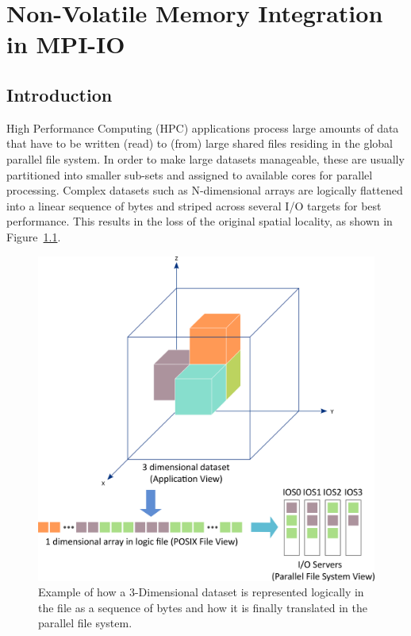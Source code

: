 \chapter{Non-Volatile Memory Integration in MPI-IO} \label{chap: deeper}

\section{Introduction}
\label{sec: motivation}
High Performance Computing (HPC) applications process large amounts of data that have to be written (read) to (from) large shared files residing in the global parallel file system. In order to make large datasets manageable, these are 
usually partitioned into smaller sub-sets and assigned to available cores for parallel processing. Complex datasets such as N-dimensional arrays are logically flattened into a linear sequence of bytes and striped across several I/O targets 
for best performance. This results in the loss of the original spatial locality, as shown in Figure~\ref{fig: small-io}.

\begin{figure}[!htb]
\centering
\includegraphics[width=\textwidth]{chapters/chapter3/figures/small-io}
\caption{Example of how a 3-Dimensional dataset is represented logically in the file as a sequence of bytes and how it is finally translated in the parallel file system.}
\label{fig: small-io}
\end{figure}

